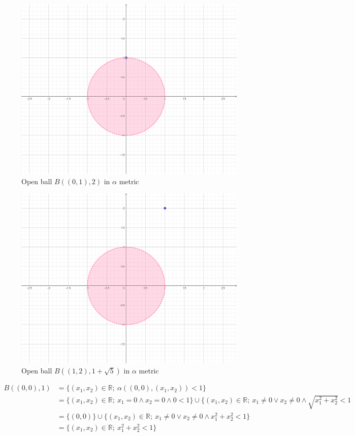 \documentclass[12pt]{article}
\begin{document}
    
    \begin{figure}
    	\centering
    	\includegraphics[scale=0.20] {graph2}
    	\caption{\label{fig:2} Open ball $B((0,1), 2) $ in $\alpha$ metric }
    \end{figure}

 \begin{figure}
	\centering
	\includegraphics[scale=0.20] {graph3}
	\caption{\label{fig:2} Open ball $B((1,2), 1+\sqrt{5}) $ in $\alpha$ metric }
\end{figure}

	 


    \begin{align*} B((0,0), 1) &= \{(x_{1}, x_{2}) \in \mathbb{R}; \ \alpha((0,0),(x_{1}, x_{2}))<1\} \\
    &= \{(x_{1}, x_{2}) \in \mathbb{R}; \ x_{1} = 0 \land x_{2} = 0 \land 0 < 1 \} \cup \{(x_{1}, x_{2}) \in \mathbb{R}; \ x_{1} \neq 0 \lor x_{2} \neq 0 \land \sqrt{x_{1}^2 + x_{2}^2} < 1 \\
    &= \{(0,0) \} \cup \{(x_{1}, x_{2}) \in \mathbb{R}; \ x_{1} \neq 0 \lor x_{2} \neq 0 \land x_{1}^2 + x_{2}^2 < 1\} \\
     &= \{(x_{1}, x_{2}) \in \mathbb{R}; \ x_{1}^2 + x_{2}^2 < 1\} 
	\end{align*}
    
\end{document}
